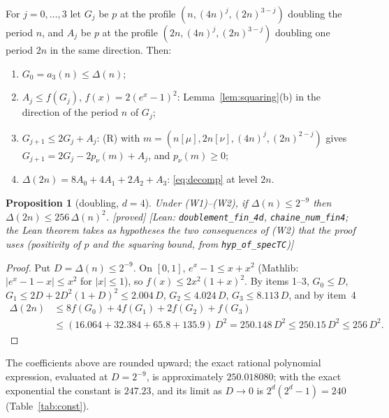 \documentclass[11pt,a4paper]{article}
\theoremstyle{plain}
\newtheorem{proposition}[theorem]{Proposition}
\theoremstyle{definition}
\theoremstyle{remark}
\numberwithin{equation}{section}
\newcommand{\st}[1]{\textsf{[#1]}}
\begin{document}
For $j=0,\dots,3$ let $G_j$ be $p$ at the profile $(n,(4n)^j,(2n)^{3-j})$ doubling the period $n$, and $A_j$ be $p$ at the profile
$(2n,(4n)^j,(2n)^{3-j})$ doubling one period $2n$ in the same direction. Then:
\begin{enumerate}
\item $G_0=a_3(n)\le\Delta(n)$;
\item $A_j\le f(G_j)$, $f(x)=2(e^x-1)^2$: Lemma~\ref{lem:squaring}(b) in the direction of the period $n$ of $G_j$;
\item $G_{j+1}\le2G_j+A_j$: (R) with $m=(n[\mu],2n[\nu],(4n)^j,(2n)^{2-j})$ gives $G_{j+1}=2G_j-2p_\nu(m)+A_j$, and $p_\nu(m)\ge0$;
\item $\Delta(2n)=8A_0+4A_1+2A_2+A_3$: \eqref{eq:decomp} at level $2n$.
\end{enumerate}

\begin{proposition}[doubling, $d=4$]\label{prop:doubling}
Under (W1)--(W2), if $\Delta(n)\le2^{-9}$ then $\Delta(2n)\le256\,\Delta(n)^2$. \st{proved} \st{Lean: \texttt{doublement\_fin\_4d}, \texttt{chaine\_num\_fin4}; the Lean theorem takes as hypotheses the two consequences of (W2) that the proof uses (positivity of $p$ and the squaring bound, from \texttt{hyp\_of\_specTC})}
\end{proposition}
\begin{proof}
Put $D=\Delta(n)\le2^{-9}$. On $[0,1]$, $e^x-1\le x+x^2$ (Mathlib: $|e^x-1-x|\le x^2$ for $|x|\le1$), so $f(x)\le2x^2(1+x)^2$. By items
1--3, $G_0\le D$, $G_1\le2D+2D^2(1+D)^2\le2.004\,D$, $G_2\le4.024\,D$, $G_3\le8.113\,D$, and by item~4
\begin{align*}
\Delta(2n)&\le8f(G_0)+4f(G_1)+2f(G_2)+f(G_3)\\
&\le(16.064+32.384+65.8+135.9)\,D^2=250.148\,D^2\le250.15\,D^2\le256\,D^2.
\end{align*}
\end{proof}
The coefficients above are rounded upward; the exact rational polynomial expression, evaluated at $D=2^{-9}$, is approximately $250.018080$; with the exact exponential the constant is $247.23$, and its limit
as $D\to0$ is $2^d(2^d-1)=240$ (Table~\ref{tab:const}).
\end{document}

